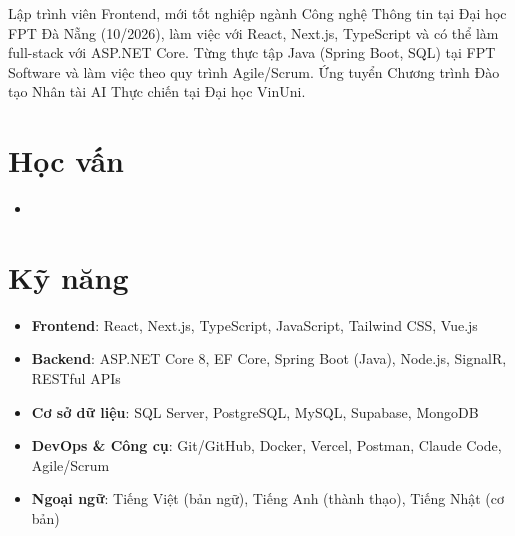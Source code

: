 \documentclass[10pt,a4paper,sans]{moderncv}
\begin{document}
\makecvtitle
\vspace{-22pt}

\small{Lập trình viên Frontend, mới tốt nghiệp ngành Công nghệ Thông tin tại Đại học FPT Đà Nẵng (10/2026), làm việc với React, Next.js, TypeScript và có thể làm full-stack với ASP.NET Core. Từng thực tập Java (Spring Boot, SQL) tại FPT Software và làm việc theo quy trình Agile/Scrum. Ứng tuyển Chương trình Đào tạo Nhân tài AI Thực chiến tại Đại học VinUni.}

\vspace{-4pt}
\section{Học vấn}
\vspace{1pt}
\begin{itemize}
\item{}
\end{itemize}

\vspace{-4pt}
\section{Kỹ năng}
\vspace{1pt}
\begin{itemize}
\item \textbf{Frontend}: React, Next.js, TypeScript, JavaScript, Tailwind CSS, Vue.js
\item \textbf{Backend}: ASP.NET Core 8, EF Core, Spring Boot (Java), Node.js, SignalR, RESTful APIs
\item \textbf{Cơ sở dữ liệu}: SQL Server, PostgreSQL, MySQL, Supabase, MongoDB
\item \textbf{DevOps \& Công cụ}: Git/GitHub, Docker, Vercel, Postman, Claude Code, Agile/Scrum
\item \textbf{Ngoại ngữ}: Tiếng Việt (bản ngữ), Tiếng Anh (thành thạo), Tiếng Nhật (cơ bản)
\end{itemize}
\end{document}

